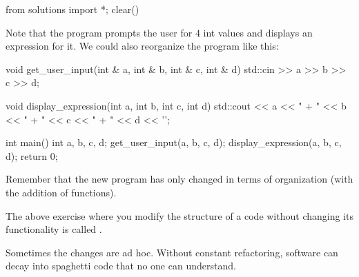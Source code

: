 \begin{python0}
from solutions import *; clear()
\end{python0}

Note that the program prompts the user for 4 int values and displays an expression for it. We could also reorganize the program like this:

\begin{consolethree}[escapeinside=||]
void get_user_input(int & a, int & b, int & c, int & d)
{
    std::cin >> a >> b >> c >> d;
}

void display_expression(int a, int b, int c, int d)
{
    std::cout << a << " + " << b << " + " << c << " + " << d << '\n';
}

int main()
{
    int a, b, c, d;
    get_user_input(a, b, c, d);
    display_expression(a, b, c, d);
    return 0;
}
\end{consolethree}

Remember that the new program has only changed in terms of organization (with the addition of functions).

The above exercise where you modify the structure of a code without changing its functionality is called .

Sometimes the changes are ad hoc. Without constant refactoring, software can decay into spaghetti code that no one can understand.


